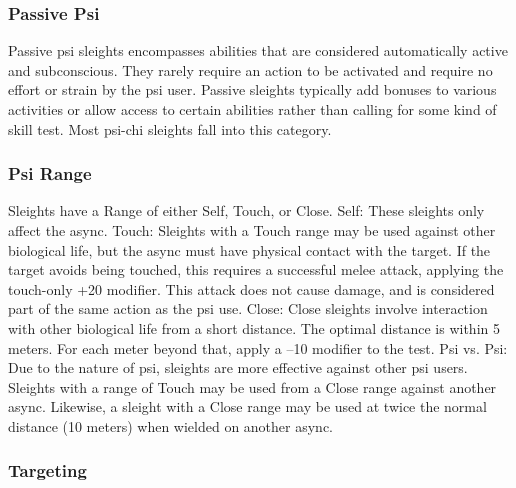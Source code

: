 \subsubsection{Passive Psi} 

Passive psi sleights encompasses abilities that are considered automatically active and subconscious. They rarely require an action to be activated and require no effort or strain by the psi user. Passive sleights typically add bonuses to various activities or allow access to certain abilities rather than calling for some kind of skill test. Most psi-chi sleights fall into this category. 

\subsubsection{Psi Range} 

Sleights have a Range of either Self, Touch, or Close. Self: These sleights only affect the async. Touch: Sleights with a Touch range may be used against other biological life, but the async must have physical contact with the target. If the target avoids being touched, this requires a successful melee attack, applying the touch-only +20 modifier. This attack does not cause damage, and is considered part of the same action as the psi use. Close: Close sleights involve interaction with other biological life from a short distance. The optimal distance is within 5 meters. For each meter beyond that, apply a –10 modifier to the test. Psi vs. Psi: Due to the nature of psi, sleights are more effective against other psi users. Sleights with a range of Touch may be used from a Close range against another async. Likewise, a sleight with a Close range may be used at twice the normal distance (10 meters) when wielded on another async. 

\subsubsection{Targeting} 

